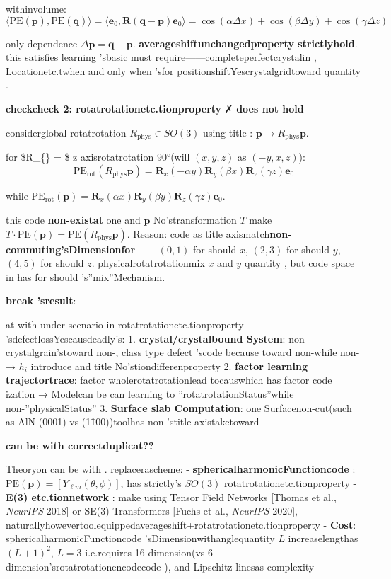 \documentclass[
  12pt,
]{article}
\begin{document}
withinvolume: 
\[\langle \text{PE}(\mathbf{p}), \text{PE}(\mathbf{q}) \rangle = \langle \mathbf{e}_0, \mathbf{R}(\mathbf{q} - \mathbf{p}) \mathbf{e}_0 \rangle = \cos(\alpha\Delta x) + \cos(\beta\Delta y) + \cos(\gamma\Delta z)\]

only dependence
\(\Delta\mathbf{p} = \mathbf{q} - \mathbf{p}\). \textbf{averageshiftunchangedproperty strictlyhold}. this satisfies learning 'sbasic must require------completeperfectcrystalin , Locationetc.twhen and only when 'sfor positionshiftYescrystalgridtoward quantity . 

\textbf{checkcheck 2: rotatrotationetc.tionproperty } ✗ \textbf{does not hold}

 considerglobal rotatrotation \(R_{\text{phys}} \in SO(3)\)
using title : \(\mathbf{p} \to R_{\text{phys}} \mathbf{p}\). 

for  \$R\_\{\} = \$  z axisrotatrotation 90°(will  \((x, y, z)\) as 
\((-y, x, z)\)):
\[\text{PE}_{\text{rot}}(R_{\text{phys}}\mathbf{p}) = \mathbf{R}_x(-\alpha y) \mathbf{R}_y(\beta x) \mathbf{R}_z(\gamma z) \mathbf{e}_0\]

while 
\(\text{PE}_{\text{rot}}(\mathbf{p}) = \mathbf{R}_x(\alpha x) \mathbf{R}_y(\beta y) \mathbf{R}_z(\gamma z) \mathbf{e}_0\). 

this code \textbf{non-existat }one and  \(\mathbf{p}\) No'stransformation \(T\) make 
\(T \cdot \text{PE}(\mathbf{p}) = \text{PE}(R_{\text{phys}}\mathbf{p})\). Reason: code as title axismatch\textbf{non-commuting'sDimensionfor }------\((0,1)\)
for should  \(x\), \((2,3)\) for should  \(y\), \((4,5)\) for should  \(z\). physicalrotatrotationmix
\(x\) and  \(y\) quantity , but code space in has for should 's''mix''Mechanism. 

\textbf{break 'sresult}: 

at with under scenario in rotatrotationetc.tionproperty 'sdefectlossYescausdeadly's:  1.
\textbf{crystal/crystalbound System}: non-crystalgrain'stoward non-, class type defect 'scode because toward non-while non-
→ \(h_i\) introduce and title No'stiondifferenproperty  2.
\textbf{factor learning trajectortrace}: factor wholerotatrotationlead tocauswhich has factor code ization  →
Modelcan be can learning to ''rotatrotationStatus''while non-''physicalStatus'' 3. \textbf{Surface slab
Computation}: one Surfacenon-cut(such as  AlN (0001) vs (11̄00))toolhas non-'stitle axistaketoward 

\textbf{can be with correctduplicat??}

Theoryon can be with . replacerascheme:  -
\textbf{sphericalharmonicFunctioncode }: \(\text{PE}(\mathbf{p}) = [Y_{\ell m}(\theta, \phi)]\), has strictly's
\(SO(3)\) rotatrotationetc.tionproperty  - \textbf{E(3) etc.tionnetwork }: make using  Tensor Field
Networks {[}Thomas et al., \emph{NeurIPS} 2018{]} or  SE(3)-Transformers
{[}Fuchs et al., \emph{NeurIPS} 2020{]}, naturallyhowevertoolequippedaverageshift+rotatrotationetc.tionproperty  -
\textbf{Cost}: sphericalharmonicFunctioncode 'sDimensionwithanglequantity  \(L\) increaselengthas 
\((L+1)^2\), \(L=3\) i.e.requires  16 dimension(vs 6 dimension'srotatrotationencodecode ), and  Lipschitz
linesas complexity 
\end{document}
